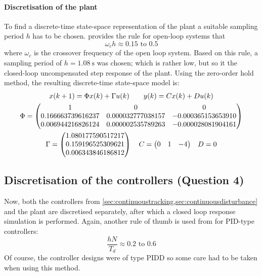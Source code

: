 \paragraph{Discretisation of the plant}
To find a discrete-time state-space representation of the plant a suitable sampling period $h$ has to be chosen. \textcite[300]{astrom} provides the rule for open-loop systems that
$$ \omega_ch \approx 0.15 \text{ to } 0.5$$
where $\omega_c$ is the crossover frequency of the open loop system. Based on this rule, a sampling period of $h = \SI{1.08}{\second}$ was chosen; which is rather low, but so it the closed-loop uncompensated step response of the plant. Using the zero-order hold method, the resulting discrete-time state-space model is:
\begin{equation}
    \begin{gathered}
        x(k+1) = \Phi x(k) + \Gamma u(k) \qquad y(k) = Cx(k) + Du(k)\\
        \Phi = 
        \begin{pmatrix}   
            1        &           0       &            0\\
            0.166663739616237  &  0.000032777038157 &  -0.000365153653910\\
            0.006944216826124 & 0.000002535789263  & -0.000028081904161 \\
        \end{pmatrix}\\
        \Gamma = \begin{pmatrix}
               1.080177590517217 \\
                0.159196525309621 \\
                 0.006343846186812\\ 
        \end{pmatrix}\quad C = \mqty(0 & 1 & -4) \quad D = 0
    \end{gathered}
\end{equation}

\subsection{Discretisation of the controllers \textnormal{\phantom{xxx}(Question 4)}}
\label{sec:discretisecontrollers}
Now, both the controllers from \cref{sec:continuoustracking,sec:continuousdisturbance} and the plant are discretised separately, after which a closed loop response simulation is performed. Again, another rule of thumb is used from \textcite[317]{astrom} for PID-type controllers:
$$ \frac{hN}{T_d} \approx 0.2 \text{ to } 0.6$$
Of course, the controller designs were of type PIDD so some care had to be taken when using this method.

